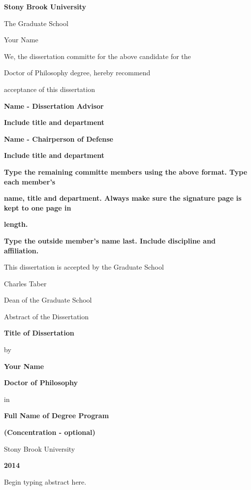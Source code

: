 \documentclass[12pt]{article}
\begin{document}
\centerline{\bf{Stony Brook University}}
\vspace*{1\baselineskip}
\centerline{The Graduate School}
\vspace*{2\baselineskip}
\centerline{Your Name}
\vspace*{2\baselineskip}
\centerline{We, the dissertation committe for the above candidate for the}
\vspace*{1\baselineskip}
\centerline{Doctor of Philosophy degree, hereby recommend}
\vspace*{1\baselineskip}
\centerline{acceptance of this dissertation}
\vspace*{2\baselineskip}
\centerline{\bf{Name - Dissertation Advisor}}
\centerline{\bf{Include title and department}}
\vspace*{2\baselineskip}
\centerline{\bf{Name - Chairperson of Defense}}
\centerline{\bf{Include title and department}}
\vspace*{2\baselineskip}
\centerline{\bf{Type the remaining committe members using the above format. Type each member's}}
\centerline{\bf{name, title and department. Always make sure the signature page is kept to one page in}} 
\centerline{\bf{length.}}
\vspace*{1\baselineskip}
\centerline{\bf{Type the outside member's name last. Include discipline and affiliation.}}
\vspace*{2\baselineskip}
\centerline{This dissertation is accepted by the Graduate School}
\vspace*{3\baselineskip}
\centerline{Charles Taber}
\centerline{Dean of the Graduate School}

\newpage

\centerline{Abstract of the Dissertation}
\vspace*{1\baselineskip}
\centerline{\bf{Title of Dissertation}}
\vspace*{1\baselineskip}
\centerline{by}
\vspace*{1\baselineskip}
\centerline{\bf{Your Name}}
\vspace*{1\baselineskip}
\centerline{\bf{Doctor of Philosophy}}
\vspace*{1\baselineskip}
\centerline{in}
\vspace*{1\baselineskip}
\centerline{\bf{Full Name of Degree Program}}
\vspace*{1\baselineskip}
\centerline{\bf{(Concentration - optional)}}
\vspace*{1\baselineskip}
\centerline{Stony Brook University}
\vspace*{1\baselineskip}
\centerline{\bf{2014}}
\vspace*{2\baselineskip}
Begin typing abstract here.
\end{document}
